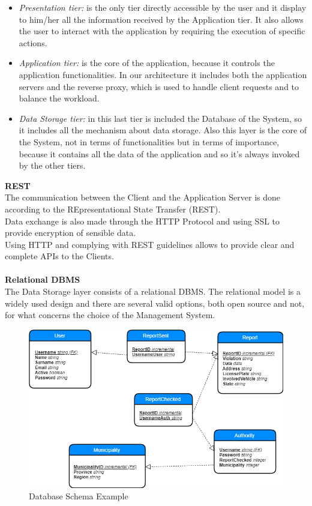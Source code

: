 \begin{itemize}
    \item \textit{Presentation tier:} is the only tier directly accessible by the user and it display to him/her all the information received by the Application tier.
    It also allows the user to interact with the application by requiring the execution of specific actions.
    \item \textit{Application tier:} is the core of the application, because it controls the application functionalities.
    In our architecture it includes both the application servers and the reverse proxy, which is used to handle client requests and to balance the workload.
    \item \textit{Data Storage tier:} in this last tier is included the Database of the System, so it includes all the mechanism about data storage. Also this layer is the core of the System, not in terms of functionalities but in terms of importance, because it contains all the data of the application and so it's always invoked by the other tiers.\\
\end{itemize}

\noindent \textbf{REST}\\
The communication between the Client and the Application Server is done according to the REpresentational State Transfer (REST).\\
Data exchange is also made through the HTTP Protocol and using SSL to provide encryption of sensible data.\\
Using HTTP and complying with REST guidelines allows to provide clear and complete APIs to the Clients.\\\\

\noindent \textbf{Relational DBMS}\\
The Data Storage layer consists of a relational DBMS. The relational model is a widely used design and there are several valid options, both open source and not, for what concerns the choice of the Management System.

\begin{figure}[H]
          \includegraphics[scale=0.5]{Images/relationalDBMS.png}
        \caption{Database Schema Example}
\end{figure}

